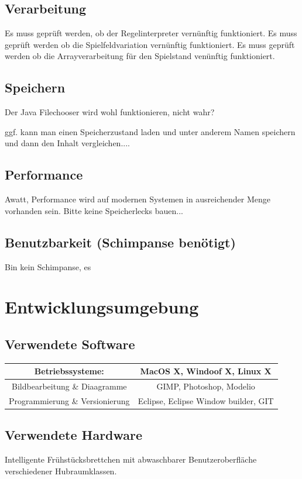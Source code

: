 \documentclass[11pt,a4paper]{article}
\begin{document}
\subsection{Verarbeitung}
Es muss geprüft werden, ob der Regelinterpreter vernünftig funktioniert. Es muss geprüft werden ob die Spielfeldvariation vernünftig funktioniert. Es muss geprüft werden ob die Arrayverarbeitung für den Spielstand venünftig funktioniert. 

\subsection{Speichern}
Der Java Filechooser wird wohl funktionieren, nicht wahr?

ggf. kann man einen Speicherzustand laden und unter anderem Namen speichern und dann den Inhalt vergleichen....
\subsection{Performance}
Awatt, Performance wird auf modernen Systemen in ausreichender Menge vorhanden sein. Bitte keine Speicherlecks bauen...
\subsection {Benutzbarkeit (Schimpanse benötigt)}
Bin kein Schimpanse, es 
\pagebreak
\section{Entwicklungsumgebung}
\subsection{Verwendete Software}
\begin{tabular}{|c|c|}
\hline
Betriebssysteme:     &  MacOS X, Windoof X, Linux X
  \\
     \hline
     Bildbearbeitung  \&  Diaagramme & 
         GIMP, Photoshop, Modelio
 \\
     \hline
     Programmierung  \& Versionierung & 
          Eclipse, 
          Eclipse Window builder,
          GIT\\
     \hline
\end{tabular}
\subsection{Verwendete Hardware}
Intelligente Frühstücksbrettchen mit abwaschbarer Benutzeroberfläche verschiedener Hubraumklassen.
\end{document}

